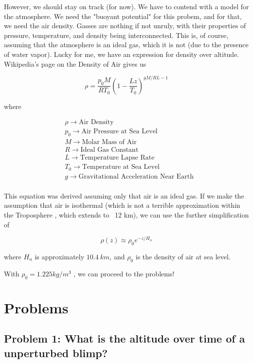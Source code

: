 \documentclass[titlepage]{article}
\begin{document}
However, we should stay on track (for now). We have to contend with a model for the atmosphere. We need the "buoyant potential" for this probem, and for that, we need the air density. Gasses are nothing if not unruly, with their properties of pressure, temperature, and density being interconnected. This is, of course, assuming that the atmosphere is an ideal gas, which it is not (due to the presence of water vapor). Lucky for me, we have an expression for density over altitude. Wikipedia's page on the Density of Air\cite{density_eqn} gives us

\[
    \rho=\frac{p_{0} M}{R T_{0}}\left(1-\frac{L z}{T_{0}}\right)^{g M / R L-1}
\]

where

\[
     \begin{split}
        &\rho \rightarrow \text{Air Density} \\
        &p_0 \rightarrow \text{Air Pressure at Sea Level} \\
        &M \rightarrow \text{Molar Mass of Air} \\
        &R \rightarrow \text{Ideal Gas Constant} \\
        &L \rightarrow \text{Temperature Lapse Rate} \\
        &T_0 \rightarrow \text{Temperature at Sea Level} \\
        &g \rightarrow \text{Gravitational Acceleration Near Earth} \\
    \end{split}
\]

This equation was derived assuming only that air is an ideal gas. If we make the assumption that air is isothermal (which is not a terrible approximation within the Troposphere \cite{troposphere}, which extends to ~12 km), we can use the further simplification of

\[
    \rho(z) \approx \rho_{0} e^{-z / H_{n}}
\]

where $H_n$ is approximately $10.4~km$, and $\rho_0$ is the density of air at sea level.

With $ \rho_0 = 1.225 kg/m^3 $\cite{density_eqn} , we can proceed to the problems!

\section{Problems}

\subsection{Problem 1: What is the altitude over time of a unperturbed blimp?}
\end{document}
